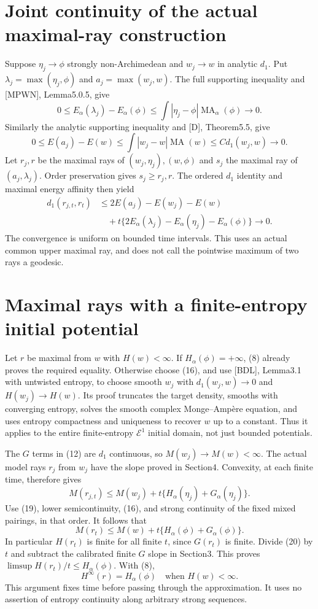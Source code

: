 \documentclass[11pt]{article}
\newcommand{\MA}{\operatorname{MA}}
\begin{document}
\section{Joint continuity of the actual maximal-ray construction}
Suppose $\eta_j\to\phi$ strongly non-Archimedean and
$w_j\to w$ in analytic $d_1$. Put
$\lambda_j=\max(\eta_j,\phi)$ and $a_j=\max(w_j,w)$.
The full supporting inequality and [MPWN], Lemma5.0.5, give
\[
 0\leq E_\alpha(\lambda_j)-E_\alpha(\phi)
      \leq\int|\eta_j-\phi|\MA_\alpha(\phi)\to0.          \tag{17}
\]
Similarly the analytic supporting inequality and [D], Theorem5.5,
give
\[
 0\leq E(a_j)-E(w)
      \leq\int|w_j-w|\MA(w)\leq C d_1(w_j,w)\to0.        \tag{18}
\]
Let $r_j,r$ be the maximal rays of $(w_j,\eta_j),(w,\phi)$ and
$s_j$ the maximal ray of $(a_j,\lambda_j)$. Order preservation
gives $s_j\geq r_j,r$. The ordered $d_1$ identity and maximal
energy affinity then yield
\[
 \begin{split}
 d_1(r_{j,t},r_t)
 &\leq 2E(a_j)-E(w_j)-E(w)\\
 &\quad+t\{2E_\alpha(\lambda_j)
                          -E_\alpha(\eta_j)-E_\alpha(\phi)\}\to0.
 \end{split}                                                \tag{19}
\]
The convergence is uniform on bounded time intervals. This uses an
actual common upper maximal ray, and does not call the pointwise
maximum of two rays a geodesic.

\section{Maximal rays with a finite-entropy initial potential}
Let $r$ be maximal from $w$ with $H(w)<\infty$.
If $H_\alpha(\phi)=+\infty$, (8) already proves the required equality.
Otherwise choose (16), and use [BDL], Lemma3.1 with untwisted
entropy, to choose smooth $w_j$ with
$d_1(w_j,w)\to0$ and $H(w_j)\to H(w)$.
Its proof truncates the target density, smooths with converging
entropy, solves the smooth complex Monge--Amp\`ere equation, and
uses entropy compactness and uniqueness to recover $w$ up to a
constant. Thus it applies to the entire finite-entropy $\mathcal E^1$
initial domain, not just bounded potentials.

The $G$ terms in (12) are $d_1$ continuous, so
$M(w_j)\to M(w)<\infty$. The actual model rays $r_j$ from $w_j$
have the slope proved in Section4. Convexity, at each finite time,
therefore gives
\[
 M(r_{j,t})\leq M(w_j)
                   +t\{H_\alpha(\eta_j)+G_\alpha(\eta_j)\}.
\]
Use (19), lower semicontinuity, (16), and strong continuity of the
fixed mixed pairings, in that order. It follows that
\[
 M(r_t)\leq M(w)+t\{H_\alpha(\phi)+G_\alpha(\phi)\}.       \tag{20}
\]
In particular $H(r_t)$ is finite for all finite $t$, since $G(r_t)$
is finite. Divide (20) by $t$ and subtract the calibrated finite
$G$ slope in Section3. This proves
$\limsup H(r_t)/t\leq H_\alpha(\phi)$. With (8),
\[
 H^\infty(r)=H_\alpha(\phi)\quad\text{when }H(w)<\infty.   \tag{21}
\]
This argument fixes time before passing through the approximation.
It uses no assertion of entropy continuity along arbitrary strong
sequences.
\end{document}
